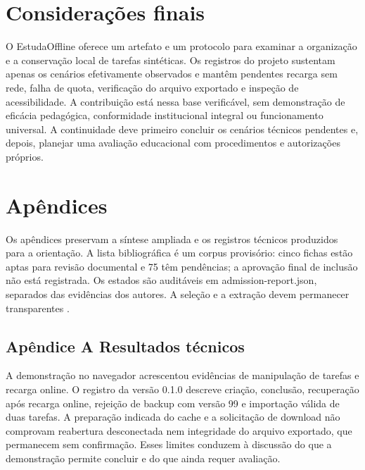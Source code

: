 \clearpage\section{Considerações finais}

O EstudaOffline oferece um artefato e um protocolo para examinar a organização e a conservação local de tarefas sintéticas. Os registros do projeto sustentam apenas os cenários efetivamente observados e mantêm pendentes recarga sem rede, falha de quota, verificação do arquivo exportado e inspeção de acessibilidade. A contribuição está nessa base verificável, sem demonstração de eficácia pedagógica, conformidade institucional integral ou funcionamento universal. A continuidade deve primeiro concluir os cenários técnicos pendentes e, depois, planejar uma avaliação educacional com procedimentos e autorizações próprios.

\clearpage\begingroup\linespread{1}\selectfont\setlength{\bibsep}{12pt}

\renewcommand{\refname}{4 Referências}

\endgroup

\clearpage\section*{Apêndices}

Os apêndices preservam a síntese ampliada e os registros técnicos produzidos para a orientação. A lista bibliográfica é um corpus provisório: cinco fichas estão aptas para revisão documental e 75 têm pendências; a aprovação final de inclusão não está registrada. Os estados são auditáveis em admission-report.json, separados das evidências dos autores. A seleção e a extração devem permanecer transparentes \citep[p. 336–337]{SU11}.

\subsection*{Apêndice A Resultados técnicos}



A demonstração no navegador acrescentou evidências de manipulação de tarefas e recarga online. O registro da versão 0.1.0 descreve criação, conclusão, recuperação após recarga online, rejeição de backup com versão 99 e importação válida de duas tarefas. A preparação indicada do cache e a solicitação de download não comprovam reabertura desconectada nem integridade do arquivo exportado, que permanecem sem confirmação. Esses limites conduzem à discussão do que a demonstração permite concluir e do que ainda requer avaliação.


